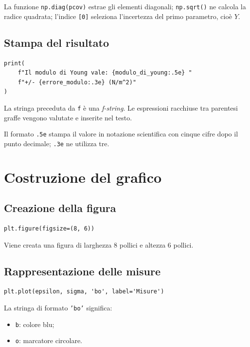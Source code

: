 \documentclass[11pt,a4paper]{book}
\begin{document}
La funzione \texttt{np.diag(pcov)} estrae gli elementi diagonali; \texttt{np.sqrt()} ne calcola la radice quadrata; l'indice \texttt{[0]} seleziona l'incertezza del primo parametro, cioè $Y$.

\subsection{Stampa del risultato}

\begin{lstlisting}
print(
    f"Il modulo di Young vale: {modulo_di_young:.5e} "
    f"+/- {errore_modulo:.3e} (N/m^2)"
)
\end{lstlisting}

La stringa preceduta da \texttt{f} è una \emph{f-string}. Le espressioni racchiuse tra parentesi graffe vengono valutate e inserite nel testo.

Il formato \texttt{.5e} stampa il valore in notazione scientifica con cinque cifre dopo il punto decimale; \texttt{.3e} ne utilizza tre.

\section{Costruzione del grafico}

\subsection{Creazione della figura}

\begin{lstlisting}
plt.figure(figsize=(8, 6))
\end{lstlisting}

Viene creata una figura di larghezza 8 pollici e altezza 6 pollici.

\subsection{Rappresentazione delle misure}

\begin{lstlisting}
plt.plot(epsilon, sigma, 'bo', label='Misure')
\end{lstlisting}

La stringa di formato \texttt{'bo'} significa:

\begin{itemize}
    \item \texttt{b}: colore blu;
    \item \texttt{o}: marcatore circolare.
\end{itemize}
\end{document}
